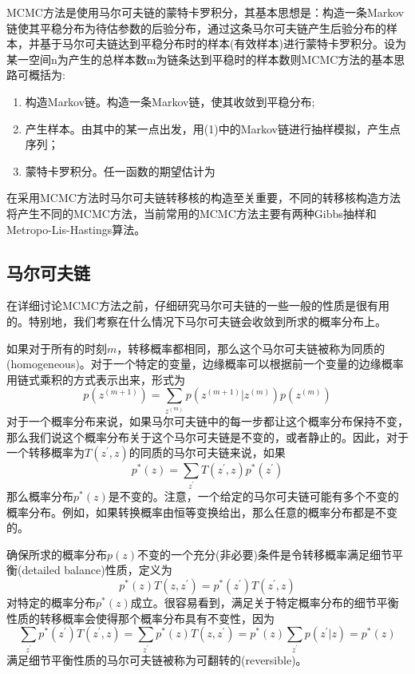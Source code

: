 MCMC方法是使用马尔可夫链的蒙特卡罗积分，其基本思想是：构造一条Markov链使其平稳分布为待估参数的后验分布，通过这条马尔可夫链产生后验分布的样本，并基于马尔可夫链达到平稳分布时的样本(有效样本)进行蒙特卡罗积分。设为某一空间n为产生的总样本数m为链条达到平稳时的样本数则MCMC方法的基本思路可概括为:
\begin{enumerate}
	\item 构造Markov链。构造一条Markov链，使其收敛到平稳分布;
	\item 产生样本。由其中的某一点出发，用(1)中的Markov链进行抽样模拟，产生点序列；
	\item 蒙特卡罗积分。任一函数的期望估计为
\end{enumerate}
在采用MCMC方法时马尔可夫链转移核的构造至关重要，不同的转移核构造方法将产生不同的MCMC方法，当前常用的MCMC方法主要有两种Gibbs抽样和Metropo-Lis-Hastings算法。
\subsection*{马尔可夫链}
在详细讨论MCMC方法之前，仔细研究马尔可夫链的一些一般的性质是很有用的。特别地，我们考察在什么情况下马尔可夫链会收敛到所求的概率分布上。 

如果对于所有的时刻$m$，转移概率都相同，那么这个马尔可夫链被称为同质的(homogeneous)。对于一个特定的变量，边缘概率可以根据前一个变量的边缘概率用链式乘积的方式表示出来，形式为
\begin{equation}
	p(z^{(m+1)})=\sum_{z^{(m)}}p(z^{(m+1)}|z^{(m)})p(z^{(m)})
\end{equation}
对于一个概率分布来说，如果马尔可夫链中的每一步都让这个概率分布保持不变，那么我们说这个概率分布关于这个马尔可夫链是不变的，或者静止的。因此，对于一个转移概率为$T(z^{'},z)$的同质的马尔可夫链来说，如果
\begin{equation}
	p^*(z)=\sum_{z^{'}}T(z^{'},z)p^*(z^{'})
\end{equation}
那么概率分布$p^*(z)$是不变的。注意，一个给定的马尔可夫链可能有多个不变的概率分布。例如，如果转换概率由恒等变换给出，那么任意的概率分布都是不变的。

确保所求的概率分布$p(z)$不变的一个充分(非必要)条件是令转移概率满足细节平衡(detailed balance)性质，定义为
\begin{equation}
	p^*(z)T(z,z^{'})=p^*(z^{'})T(z^{'},z)
\end{equation}
对特定的概率分布$p^*(z)$成立。很容易看到，满足关于特定概率分布的细节平衡性质的转移概率会使得那个概率分布具有不变性，因为 
\begin{equation}
	\sum_{z^{'}}p^*(z^{'})T(z^{'},z)=\sum_{z^{'}}p^*(z)T(z,z^{'})=p^*(z)\sum_{z^{'}}p(z^{'}|z)=p^*(z)
\end{equation}
满足细节平衡性质的马尔可夫链被称为可翻转的(reversible)。

